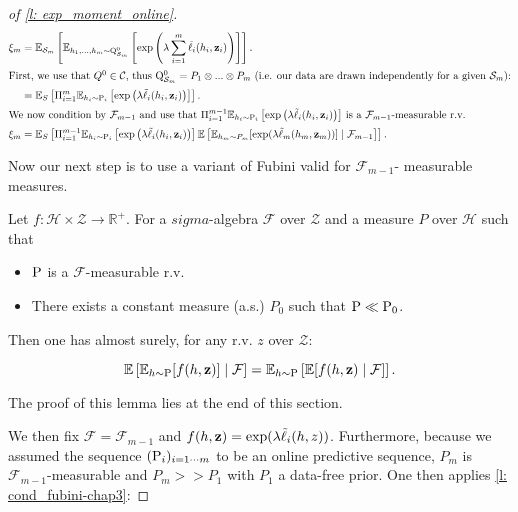 \begin{noaddcontents}
\begin{proof}[of \cref{l: exp_moment_online}]
\begin{align*}
  \xi_m & = \mathbb{E}_{\Sm}\left[\mathbb{E}_{h_1,...,h_m \sim \Q_{\Sm}^0} \left[\exp\left(\lambda \sum_{i=1}^m \Tilde{\ell}_i(h_i,\z_i)\right)\right]\right].\\
  \intertext{First, we use that $Q^0\in\mathcal{C}$, thus $\Q_{\Sm}^0 = P_1\otimes...\otimes P_m$ (i.e. our data are drawn independently for a given $\Sm$):}
  &= \mathbb{E}_S\left[\Pi_{i=1}^m \mathbb{E}_{h_i \sim \P_{i}} \left[\exp\left(\lambda  \Tilde{\ell}_i(h_i,\z_i)\right)\right]\right].\\
  \intertext{We now condition by $\mathcal{F}_{m-1}$ and use that $\Pi_{i=1}^{m-1}\mathbb{E}_{h_i \sim \P_{i}} \left[\exp\left(\lambda  \Tilde{\ell}_i(h_i,\z_i)\right)\right]$ is a $\mathcal{F}_{m-1}$-measurable r.v.}
  \xi_m & = \mathbb{E}_S\left[ \Pi_{i=1}^{m-1}\mathbb{E}_{h_i \sim \P_{i}} \left[\exp\left(\lambda  \Tilde{\ell}_i(h_i,\z_i)\right)\right] \mathbb{E}
\left[ \mathbb{E}_{h_m\sim P_m} [\exp(\lambda \Tilde{\ell}_m(h_m,\z_m))] \mid \mathcal{F}_{m-1} \right] \right].
\end{align*}

Now our next step is to use a variant of Fubini valid for $\mathcal{F}_{m-1}$- measurable measures.

\begin{lemma}
  \label{l: cond_fubini-chap3}
  Let $f: \mathcal{H}\times \mathcal{Z} \rightarrow \mathbb{R}^+$.
  For a $sigma$-algebra $\mathcal{F}$ over $\mathcal{Z}$ and a measure $P$ over $\mathcal{H}$ such that
  \begin{itemize}
    \item $\P$ is a $\mathcal{F}$-measurable r.v.
    \item There exists a constant measure (a.s.) $P_0$ such that $\P\ll \P_0$.
  \end{itemize}
  Then one has almost surely, for any r.v. $z$ over $\mathcal{Z}$:

  \[ \mathbb{E}\left[\mathbb{E}_{h\sim \P} [f(h,\z)] \mid \mathcal{F} \right] =  \mathbb{E}_{h\sim \P} \left[ \mathbb{E}[f(h,\z)\mid \mathcal{F}] \right].    \]
\end{lemma}

\noindent The proof of this lemma lies at the end of this section.

\noindent We then fix $\mathcal{F}= \mathcal{F}_{m-1}$ and $f(h,\z)= \exp(\lambda\Tilde{\ell}_i(h,z))$. Furthermore, because we assumed the sequence $(\P_{i})_{i=1\cdots m}$ to be an online predictive sequence, $P_m$ is $\mathcal{F}_{m-1}$-measurable and $P_m>>P_1$ with $P_1$ a data-free prior. One then applies \cref{l: cond_fubini-chap3}:


\end{proof}
\end{noaddcontents}
